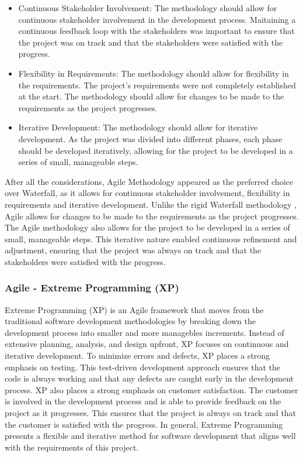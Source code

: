 \begin{itemize}
    \item Continuous Stakeholder Involvement: The methodology should allow for continuous stakeholder involvement in the development process. Maitaining a continuous feedback loop with the stakeholders was important to ensure that the project was on track and that the stakeholders were satisfied with the progress.
    \item Flexibility in Requirements: The methodology should allow for flexibility in the requirements. The project's requirements were not completely established at the start. The methodology should allow for changes to be made to the requirements as the project progresses.
    \item Iterative Development: The methodology should allow for iterative development. As the project was divided into different phases, each phase should be developed iteratively, allowing for the project to be developed in a series of small, manageable steps.    
\end{itemize}

After all the considerations, Agile Methodology \cite{despa2014comparative} appeared as the preferred choice over Waterfall, as it allows for continuous stakeholder involvement, flexibility in requirements and iterative development.
Unlike the rigid Waterfall methodology \cite{despa2014comparative}, Agile allows for changes to be made to the requirements as the project progresses. The Agile methodology also allows for the project to be developed in a series of small, manageable steps.
This iterative nature enabled continuous refinement and adjustment, ensuring that the project was always on track and that the stakeholders were satisfied with the progress.

\subsubsection*{Agile - Extreme Programming (XP)}
Extreme Programming (XP) is an Agile framework that moves from the traditional software development methodologies by breaking down the development process into smaller and more managebles increments.
Instead of extensive planning, analysis, and design upfront, XP focuses on continuous and iterative development. To minimize errors and defects, XP places a strong emphasis on testing.
This test-driven development approach ensures that the code is always working and that any defects are caught early in the development process.
XP also places a strong emphasis on customer satisfaction. The customer is involved in the development process and is able to provide feedback on the project as it progresses. This ensures that the project is always on track and that the customer 
is satisfied with the progress. \cite{despa2014comparative} 
In general, Extreme Programming presents a flexible and iterative method for software development that aligns well with the requirements of this project.


